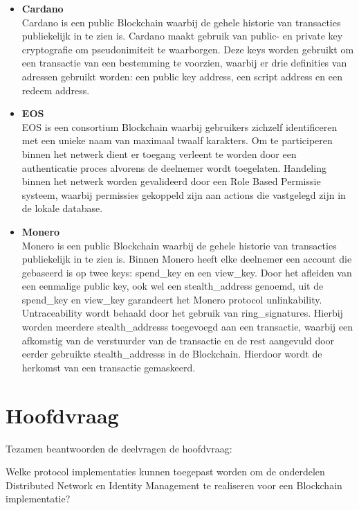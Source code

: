 \begin{enumerate}
\begin{itemize}
    \item \textbf{Cardano}
    \\ Cardano is een public Blockchain waarbij de gehele historie van transacties publiekelijk in te zien is. Cardano maakt gebruik van public- en private key cryptografie om pseudonimiteit te waarborgen. Deze keys worden gebruikt om een transactie van een bestemming te voorzien, waarbij er drie definities van adressen gebruikt worden: een public key address, een script address en een redeem address.

    \item \textbf{EOS}
    \\ EOS is een consortium Blockchain waarbij gebruikers zichzelf identificeren met een unieke naam van maximaal twaalf karakters. Om te participeren binnen het netwerk dient er toegang verleent te worden door een authenticatie proces alvorens de deelnemer wordt toegelaten.  Handeling binnen het netwerk worden gevalideerd door een Role Based Permissie systeem, waarbij permissies gekoppeld zijn aan actions die vastgelegd zijn in de lokale database.

    \item \textbf{Monero}
    \\ Monero is een public Blockchain waarbij de gehele historie van transacties publiekelijk in te zien is. Binnen Monero heeft elke deelnemer een account die gebaseerd is op twee keys: \gls{spend_key} en een \gls{view_key}. Door het afleiden van een eenmalige public key, ook wel een \gls{stealth_address} genoemd, uit de \gls{spend_key} en \gls{view_key} garandeert het Monero protocol unlinkability. Untraceability wordt behaald door het gebruik van \glspl{ring_signature}. Hierbij worden meerdere \glspl{stealth_address} toegevoegd aan een transactie, waarbij een afkomstig van de verstuurder van de transactie en de rest aangevuld door eerder gebruikte \glspl{stealth_address} in de Blockchain. Hierdoor wordt de herkomst van een transactie gemaskeerd.
  \end{itemize}
\end{enumerate}

\newpage
\section{Hoofdvraag}
Tezamen beantwoorden de deelvragen de hoofdvraag:

\begin{formal}
  Welke protocol implementaties kunnen toegepast worden om de onderdelen Distributed Network en Identity Management te realiseren voor een Blockchain implementatie?
\end{formal}

